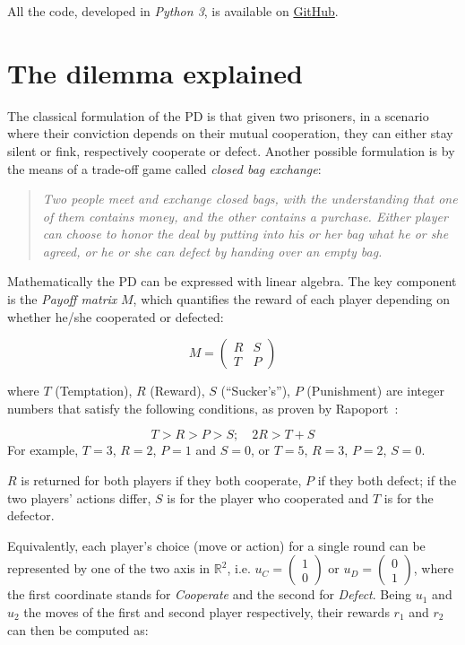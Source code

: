 \documentclass[journal,a4paper,10pt,twoside]{IEEEtran} %
\begin{document}
All the code, developed in \textit{Python 3}, is available on \href{https://github.com/eliabntt/LaboratoryOfComputationalPhysics/tree/Group9}{GitHub}.

\section{The dilemma explained} \label{s:game}
The classical formulation of the PD is that given two prisoners, in a scenario where their conviction depends on their mutual cooperation, they can either stay silent or fink, respectively cooperate or defect.
Another possible formulation is by the means of a trade-off game called \textit{closed bag exchange}:

\begin{quote}
\textit{Two people meet and exchange closed bags, with the understanding that one of them contains money, and the other contains a purchase. Either player can choose to honor the deal by putting into his or her bag what he or she agreed, or he or she can defect by handing over an empty bag.}
\end{quote}

Mathematically the PD can be expressed with linear algebra. The key component is the \textit{Payoff matrix} $M$, which quantifies the reward of each player depending on whether he/she cooperated or defected:

$$
M = 
\begin{pmatrix} 
R & S \\
T & P 
\end{pmatrix}
$$

where $T$ (Temptation), $R$ (Reward), $S$ (``Sucker's''), $P$ (Punishment) are integer numbers that satisfy the following conditions, as proven by Rapoport~\cite{rapoport}:

$$
T>R>P>S; \quad 2R > T+S 
$$
For example, $T=3$, $R=2$, $P=1$ and $S=0$, or  $T=5$, $R=3$, $P=2$, $S=0$. 

$R$ is returned for both players if they both cooperate, $P$ if they both defect; if the two players' actions differ, $S$ is for the player who cooperated and $T$ is for the defector.

Equivalently, each player's choice (move or action) for a single round can be represented by one of the two axis in $\mathbb{R}^2$, i.e. $u_C=\begin{pmatrix} 1 \\ 0 \end{pmatrix}$ or $u_D=\begin{pmatrix} 0 \\ 1 \end{pmatrix}$, where the first coordinate stands for \textit{Cooperate} and the second for \textit{Defect}. Being $u_1$ and $u_2$ the moves of the first and second player respectively, their rewards $r_1$ and $r_2$ can then be computed as:
\end{document}
